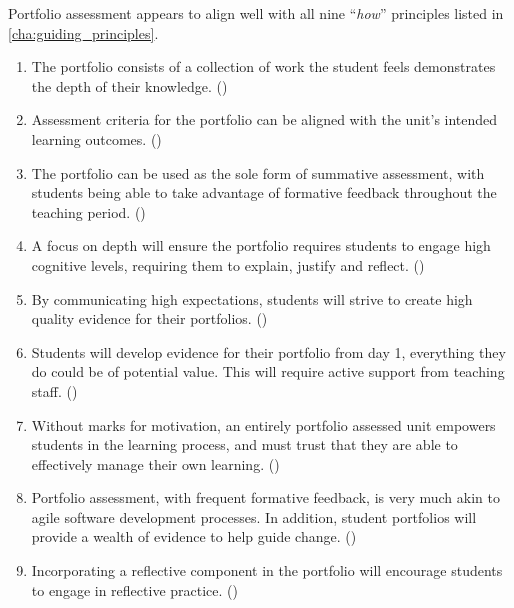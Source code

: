 Portfolio assessment appears to align well with all nine ``\emph{how}'' principles listed in \cref{cha:guiding_principles}. 
\begin{enumerate}
	\item The portfolio consists of a collection of work the student feels demonstrates the depth of their knowledge. ()
	\item Assessment criteria for the portfolio can be aligned with the unit's intended learning outcomes. ()
	\item The portfolio can be used as the sole form of summative assessment, with students being able to take advantage of formative feedback throughout the teaching period. ()
	\item A focus on depth will ensure the portfolio requires students to engage high cognitive levels, requiring them to explain, justify and reflect. ()
	\item By communicating high expectations, students will strive to create high quality evidence for their portfolios. ()
	\item Students will develop evidence for their portfolio from day 1, everything they do could be of potential value. This will require active support from teaching staff. ()
	\item Without marks for motivation, an entirely portfolio assessed unit empowers students in the learning process, and must trust that they are able to effectively manage their own learning. ()
	\item Portfolio assessment, with frequent formative feedback, is very much akin to agile software development processes. In addition, student portfolios will provide a wealth of evidence to help guide change. ()
	\item Incorporating a reflective component in the portfolio will encourage students to engage in reflective practice. ()
\end{enumerate}






